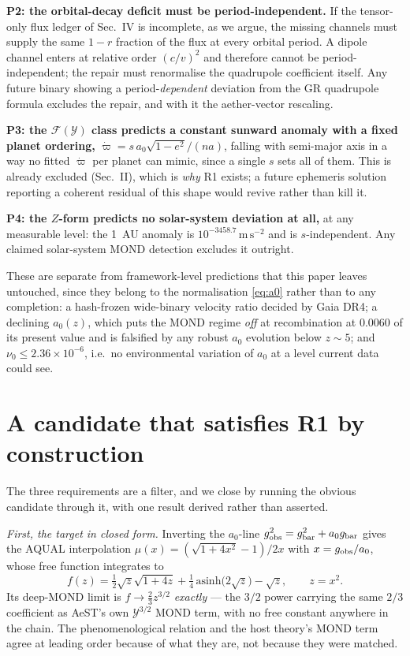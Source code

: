 \documentclass[aps,prd,twocolumn,10pt,nofootinbib,superscriptaddress]{revtex4-2}
\newcommand{\FF}{\mathcal{F}}
\newcommand{\YY}{\mathcal{Y}}
\begin{document}
\textbf{P2: the orbital-decay deficit must be period-independent.} If the tensor-only flux ledger
of Sec.~IV is incomplete, as we argue, the missing channels must supply the same $1-r$ fraction of
the flux at every orbital period. A dipole channel enters at relative order $(c/v)^2$ and therefore
cannot be period-independent; the repair must renormalise the quadrupole coefficient itself. Any
future binary showing a period-\emph{dependent} deviation from the GR quadrupole formula excludes
the repair, and with it the aether-vector rescaling.

\textbf{P3: the $\FF(\YY)$ class predicts a constant sunward anomaly with a fixed planet ordering,}
$\dot\varpi=s\,a_0\sqrt{1-e^2}/(na)$, falling with semi-major axis in a way no fitted $\dot\varpi$
per planet can mimic, since a single $s$ sets all of them. This is already excluded (Sec.~II),
which is \emph{why} R1 exists; a future ephemeris solution reporting a coherent residual of this
shape would revive rather than kill it.

\textbf{P4: the $Z$-form predicts no solar-system deviation at all,} at any measurable level:
the 1~AU anomaly is $10^{-3458.7}\,\mathrm{m\,s^{-2}}$ and is $s$-independent. Any claimed
solar-system MOND detection excludes it outright.

These are separate from framework-level predictions that this paper leaves untouched, since they
belong to the normalisation \eqref{eq:a0} rather than to any completion: a hash-frozen wide-binary
velocity ratio decided by Gaia DR4; a declining $a_0(z)$, which puts the MOND regime \emph{off} at
recombination at $0.0060$ of its present value and is falsified by any robust $a_0$ evolution below
$z\sim5$; and $\nu_0\le2.36\times10^{-6}$, i.e.\ no environmental variation of $a_0$ at a level
current data could see.

\section{A candidate that satisfies R1 by construction}

The three requirements are a filter, and we close by running the obvious candidate through it,
with one result derived rather than asserted.

\emph{First, the target in closed form.} Inverting the $a_0$-line $g_{\rm obs}^2=g_{\rm
bar}^2+a_0g_{\rm bar}$ gives the AQUAL interpolation
$\mu(x)=(\sqrt{1+4x^2}-1)/2x$ with $x=g_{\rm obs}/a_0$, whose free function integrates to
\begin{equation}
f(z)=\tfrac12\sqrt{z}\sqrt{1+4z}+\tfrac14\,\mathrm{asinh}\big(2\sqrt z\big)-\sqrt z,
\qquad z=x^2 .
\label{eq:fclosed}
\end{equation}
Its deep-MOND limit is $f\to\tfrac23 z^{3/2}$ \emph{exactly} --- the $3/2$ power carrying the
same $2/3$ coefficient as AeST's own $\YY^{3/2}$ MOND term, with no free constant anywhere in
the chain. The phenomenological relation and the host theory's MOND term agree at leading order
because of what they are, not because they were matched.
\end{document}
